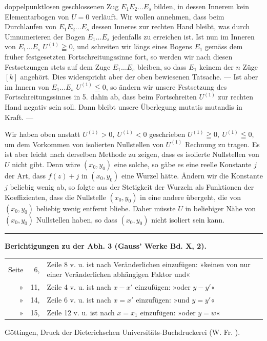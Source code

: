doppelpunktlosen geschlossenen Zug \(E_1E_2\ldots E_s\) bilden, in dessen Innerem
kein Elementarbogen von \(U=0\) verläuft. Wir wollen annehmen, dass beim
Durchlaufen von \(E_1E_2\ldots E_s\) dessen Inneres zur rechten Hand bleibt, was
durch Umnumerieren der Bogen \(E_1\ldots E_s\) jedenfalls zu erreichen ist. Ist
nun im Inneren von \(E_1\ldots E_s\) \(U^{(1)}\geqq0\), und schreiten wir längs eines Bogens
\(E_1\) gemäss dem früher festgesetzten Fortschreitungssinne fort, so werden wir nach
diesen Festsetzungen stets auf dem Zuge \(E_1\ldots E_s\) bleiben, so dass \(E_1\) keinem
der \(n\) Züge \([k]\) angehört. Dies widerspricht aber der oben bewiesenen Tatsache.
— Ist aber im Innern von \(E_1\ldots E_s\) \(U^{(1)}\leqq0\), so ändern wir unsere
Festsetzung des Fortschreitungssinnes in 5. dahin ab, dass beim Fortschreiten
\(U^{(1)}\) zur rechten Hand negativ sein soll. Dann bleibt unsere Überlegung mutatis
mutandis in Kraft. —
\par\clearpage{}
Wir haben oben anstatt \(U^{(1)}>0,\ U^{(1)}<0\) geschrieben \(U^{(1)}\geqq0,\ U^{(1)}\leqq0\),
um dem Vorkommen von isolierten Nullstellen von \(U^{(1)}\) Rechnung zu tragen. Es
ist aber leicht nach derselben Methode zu zeigen, dass es isolierte Nullstellen
von \(U\) nicht gibt. Denn wäre \((x_0,y_0)\) eine solche, so gäbe es eine reelle
Konstante \(j\) der Art, dass \(f(z)+j\) in \((x_0,y_0)\) eine Wurzel hätte. Ändern wir
die  Konstante \(j\) beliebig wenig ab, so folgte aus der Stetigkeit der
Wurzeln als Funktionen der Koeffizienten, dass die Nullstelle \((x_0,y_0)\) in eine
andere übergeht, die von \((x_0,y_0)\) beliebig wenig entfernt bliebe. Daher müsste
\(U\) in beliebiger Nähe von \((x_0,y_0)\) Nullstellen haben, so dass \((x_0,y_0)\) nicht
isoliert sein kann.
\par\bigskip
\begin{center}\rule{3.4cm}{.4pt}\end{center}
\vspace{1.2cm}
\begin{center}\textbf{Berichtigungen zu der Abh. 3 (Gauss' Werke Bd. X, 2).}\end{center}
{\small
\begin{tabularx}{\linewidth}{@{}r r X@{}}
Seite&6,&Zeile 8 v. u. ist nach Veränderlichen einzufügen: »keinen von nur einer Veränderlichen abhängigen Faktor und«\\
»&11,&Zeile 4 v. u. ist nach \(x-x'\) einzufügen: »oder \(y-y'\)«\\
»&14,&Zeile 6 v. u. ist nach \(x=x'\) einzufügen: »und \(y=y'\)«\\
»&15,&Zeile 12 v. u. ist nach \(x=x_1\) einzufügen: »oder \(y=w\)«
\end{tabularx}\par}
\vfill
\begin{center}\small Göttingen, Druck der Dieterichschen Universitäts-Buchdruckerei (W. Fr. ).\end{center}
\par

